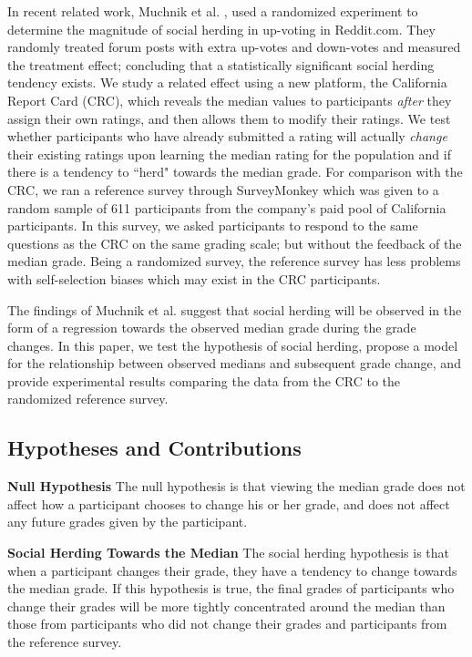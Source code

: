 In recent related work, Muchnik et al. \cite{muchnik2013social}, used a randomized experiment to determine the magnitude of social herding in up-voting in Reddit.com.
They randomly treated forum posts with extra up-votes and down-votes and measured the treatment effect; concluding that a statistically significant social herding tendency exists.
We study a related effect using a new platform, the California Report Card (CRC), which reveals the median values to participants \emph{after} they assign their own ratings, and then allows them to modify their ratings.
We test whether participants who have already submitted a rating will actually \emph{change} their existing ratings upon learning the median rating for the population and if there is a tendency to ``herd" towards the median grade.
For comparison with the CRC, we ran a reference survey through SurveyMonkey which was given to a random sample of 611 participants from the company's paid pool of California participants.
In this survey, we asked participants to respond to the same questions as the CRC on the same grading scale; but without the feedback of the median grade.
Being a randomized survey, the reference survey has less problems with self-selection biases which may exist in the CRC participants. 

The findings of Muchnik et al. suggest that social herding will be observed in the form of a regression towards the observed median grade during the grade changes.
In this paper, we test the hypothesis of social herding, propose a model for the relationship between observed medians and subsequent grade change, and provide experimental results comparing the data from the CRC to the randomized reference survey.

\subsection{Hypotheses and Contributions}
\noindent \textbf{Null Hypothesis} The null hypothesis is that viewing the median grade does not affect how a participant chooses to change his or her grade, and does not affect any future grades given by the participant.

\noindent \textbf{Social Herding Towards the Median} The social herding hypothesis is that when a participant changes their grade, they have a tendency to change towards the median grade. If this hypothesis is true, the final grades of participants who change their grades will be more tightly concentrated around the median than those from participants who did not change their grades and participants from the reference survey.

